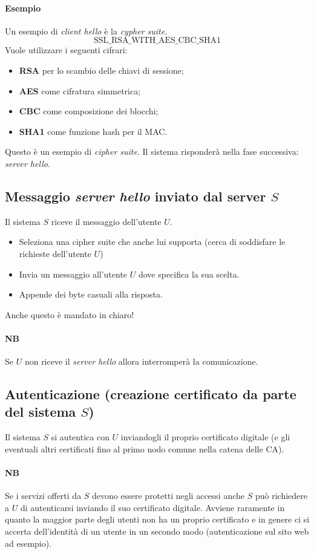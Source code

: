 \paragraph{Esempio} Un esempio di \emph{client hello} è la \emph{cypher suite}. 
\[\boxed{\text{SSL\_RSA\_WITH\_AES\_CBC\_SHA1}}\]
Vuole utilizzare i seguenti cifrari:
\begin{itemize}
    \item \textbf{RSA} per lo scambio delle chiavi di sessione;
    \item \textbf{AES} come cifratura simmetrica;
    \item \textbf{CBC} come composizione dei blocchi;
    \item \textbf{SHA1} come funzione hash per il MAC.
\end{itemize}
Questo è un esempio di \emph{cipher suite}. Il sistema risponderà nella fase successiva: \emph{server hello}.

\subsection{Messaggio \emph{server hello} inviato dal server $S$}
Il sistema $S$ riceve il messaggio dell'utente $U$.
\begin{itemize}
	\item Seleziona una cipher suite che anche lui supporta (cerca di soddisfare le richieste dell'utente $U$)
	\item Invia un messaggio all'utente $U$ dove specifica la sua scelta.
	\item Appende dei byte casuali alla risposta. 
\end{itemize}
Anche questo è mandato in chiaro!

\paragraph{NB} Se $U$ non riceve il \emph{server hello} allora interromperà la comunicazione.

\subsection{Autenticazione (creazione certificato da parte del sistema $S$)}
Il sistema $S$ si autentica con $U$ inviandogli il proprio certificato digitale (e gli eventuali altri certificati fino al primo nodo comune nella catena delle CA).

\paragraph{NB} Se i servizi offerti da $S$ devono essere protetti negli accessi anche $S$ può richiedere a $U$ di autenticarsi inviando il suo certificato digitale. Avviene raramente in quanto la maggior parte degli utenti non ha un proprio certificato e in genere ci si accerta dell'identità di un utente in un secondo modo (autenticazione sul sito web ad esempio).

